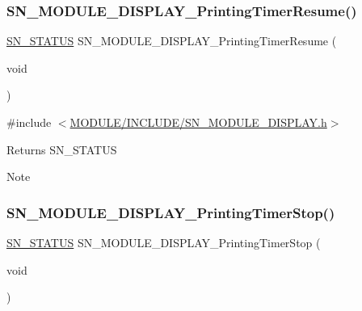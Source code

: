\subsubsection{\texorpdfstring{S\+N\+\_\+\+M\+O\+D\+U\+L\+E\+\_\+\+D\+I\+S\+P\+L\+A\+Y\+\_\+\+Printing\+Timer\+Resume()}{SN\_MODULE\_DISPLAY\_PrintingTimerResume()}}
{\footnotesize\ttfamily \hyperlink{group__SYSTEM__ERROR_ga4540713b9a7a18ce44d78c3a10f7442f}{S\+N\+\_\+\+S\+T\+A\+T\+US} S\+N\+\_\+\+M\+O\+D\+U\+L\+E\+\_\+\+D\+I\+S\+P\+L\+A\+Y\+\_\+\+Printing\+Timer\+Resume (\begin{DoxyParamCaption}\item[{void}]{ }\end{DoxyParamCaption})}



{\ttfamily \#include $<$\hyperlink{SN__MODULE__DISPLAY_8h}{M\+O\+D\+U\+L\+E/\+I\+N\+C\+L\+U\+D\+E/\+S\+N\+\_\+\+M\+O\+D\+U\+L\+E\+\_\+\+D\+I\+S\+P\+L\+A\+Y.\+h}$>$}

\begin{DoxyReturn}{Returns}
S\+N\+\_\+\+S\+T\+A\+T\+US
\end{DoxyReturn}
\begin{DoxyNote}{Note}

\end{DoxyNote}
\mbox{\label{group__MODULE__DISPLAY_ga23a40fbba57f5da86b6173fe40861196}} 
\subsubsection{\texorpdfstring{S\+N\+\_\+\+M\+O\+D\+U\+L\+E\+\_\+\+D\+I\+S\+P\+L\+A\+Y\+\_\+\+Printing\+Timer\+Stop()}{SN\_MODULE\_DISPLAY\_PrintingTimerStop()}}
{\footnotesize\ttfamily \hyperlink{group__SYSTEM__ERROR_ga4540713b9a7a18ce44d78c3a10f7442f}{S\+N\+\_\+\+S\+T\+A\+T\+US} S\+N\+\_\+\+M\+O\+D\+U\+L\+E\+\_\+\+D\+I\+S\+P\+L\+A\+Y\+\_\+\+Printing\+Timer\+Stop (\begin{DoxyParamCaption}\item[{void}]{ }\end{DoxyParamCaption})}



